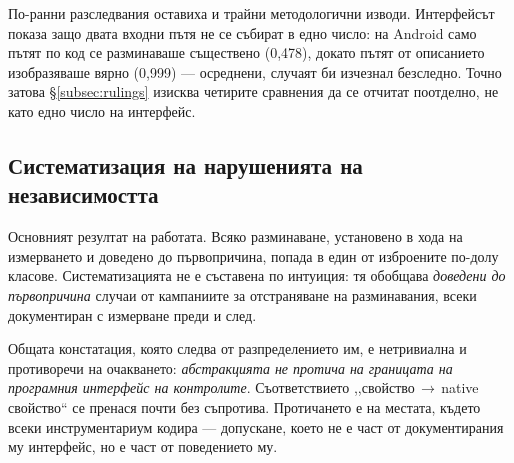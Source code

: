 По-ранни разследвания оставиха и трайни методологични изводи. Интерфейсът  показа защо
двата входни пътя не се събират в едно число: на Android само пътят по код се разминаваше съществено
(0{,}478), докато пътят от описанието изобразяваше вярно (0{,}999) --- осреднени, случаят би
изчезнал безследно. Точно затова §\ref{subsec:rulings} изисква четирите сравнения да се отчитат
поотделно, не като едно число на интерфейс.



\subsection{Систематизация на нарушенията на независимостта}
\label{subsec:taxonomy}

Основният резултат на работата. Всяко разминаване, установено в хода на измерването и доведено до
първопричина, попада в един от изброените по-долу класове. Систематизацията не е съставена по
интуиция: тя обобщава \emph{доведени до първопричина} случаи от кампаниите за отстраняване на
разминавания, всеки документиран с измерване преди и след.

Общата констатация, която следва от разпределението им, е нетривиална и противоречи на очакването:
\emph{абстракцията не протича на границата на програмния интерфейс на контролите}. Съответствието
,,свойство\,$\rightarrow$\,native свойство“ се пренася почти без съпротива. Протичането е на
местата, където всеки инструментариум кодира  --- допускане, което не е
част от документирания му интерфейс, но е част от поведението му.

